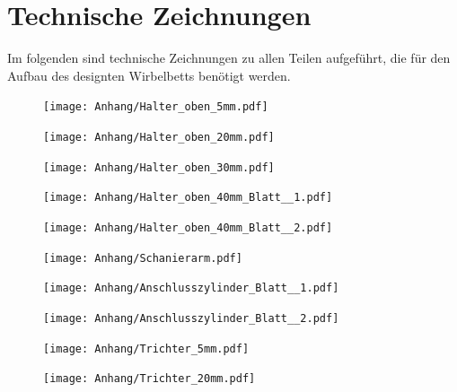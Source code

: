 \clearpage

\section*{Technische Zeichnungen}

Im folgenden sind technische Zeichnungen zu allen Teilen aufgeführt, die für den Aufbau des designten Wirbelbetts benötigt werden.


\captionsetup{listof=false}

\begin{figure}  
	\texttt{[image: Anhang/Halter\_oben\_5mm.pdf]}
\end{figure}

\begin{figure}  
	\texttt{[image: Anhang/Halter\_oben\_20mm.pdf]}
\end{figure}

\begin{figure}  
	\texttt{[image: Anhang/Halter\_oben\_30mm.pdf]}
\end{figure}

\begin{figure}  
	\texttt{[image: Anhang/Halter\_oben\_40mm\_Blatt\_\_1.pdf]}
\end{figure}

\begin{figure}  
	\texttt{[image: Anhang/Halter\_oben\_40mm\_Blatt\_\_2.pdf]}
\end{figure}

\begin{figure}  
	\texttt{[image: Anhang/Schanierarm.pdf]}
\end{figure}

\begin{figure}  
	\texttt{[image: Anhang/Anschlusszylinder\_Blatt\_\_1.pdf]}
\end{figure}

\begin{figure}  
	\texttt{[image: Anhang/Anschlusszylinder\_Blatt\_\_2.pdf]}
\end{figure}

\begin{figure}  
	\texttt{[image: Anhang/Trichter\_5mm.pdf]}
\end{figure}

\begin{figure} 
	\texttt{[image: Anhang/Trichter\_20mm.pdf]}
\end{figure}

